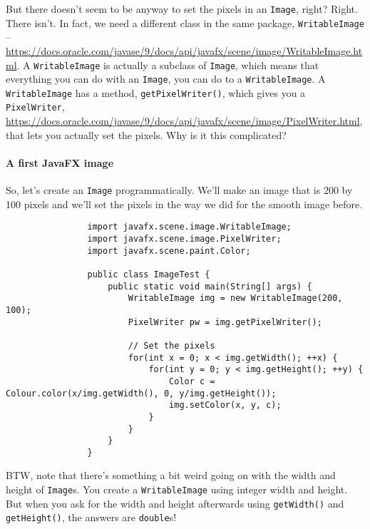 \documentclass{article}
\begin{document}
        But there doesn't seem to be anyway to set the pixels in an \texttt{Image}, right? Right. There isn't. In fact, we need a different
        class in the same package, \texttt{WritableImage} --
        \url{https://docs.oracle.com/javase/9/docs/api/javafx/scene/image/WritableImage.html}. A \texttt{WritableImage} is actually a
        subclass of \texttt{Image}, which means that everything you can do with an \texttt{Image}, you can do to a \texttt{WritableImage}.
        A \texttt{WritableImage} has a method, \texttt{getPixelWriter()}, which gives you a \texttt{PixelWriter},
        \url{https://docs.oracle.com/javase/9/docs/api/javafx/scene/image/PixelWriter.html}, that lets you actually set the pixels. Why is
        it this complicated?

        \paragraph{A first JavaFX image}
            So, let's create an \texttt{Image} programmatically. We'll make an image that is 200 by 100 pixels and we'll set the pixels in
            the way we did for the smooth image before.
        
            \begin{verbatim}
                import javafx.scene.image.WritableImage;
                import javafx.scene.image.PixelWriter;
                import javafx.scene.paint.Color;

                public class ImageTest {
                    public static void main(String[] args) {
                        WritableImage img = new WritableImage(200, 100);
                        PixelWriter pw = img.getPixelWriter();
        
                        // Set the pixels
                        for(int x = 0; x < img.getWidth(); ++x) {
                            for(int y = 0; y < img.getHeight(); ++y) {
                                Color c = Colour.color(x/img.getWidth(), 0, y/img.getHeight());
                                img.setColor(x, y, c);
                            }
                        }
                    }
                }
            \end{verbatim}
        
            BTW, note that there's something a bit weird going on with the width and height of \texttt{Image}s. You create a
            \texttt{WritableImage} using integer width and height. But when you ask for the width and height afterwards using
            \texttt{getWidth()} and \texttt{getHeight()}, the answers are \texttt{double}s!
\end{document}
